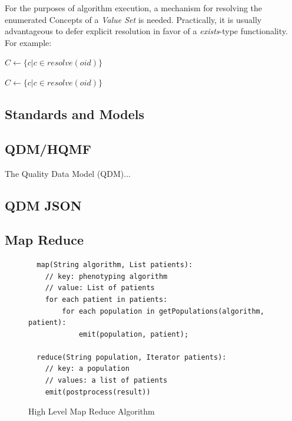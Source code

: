 \documentclass{amia}
\begin{document}
For the purposes of algorithm execution, a mechanism for resolving the enumerated Concepts of a \textit{Value Set} is needed. Practically, it is usually advantageous to defer explicit resolution in favor of a \textit{exists}-type functionality. For example:

\begin{algorithm}
\begin{algorithmic}[1]
  \State $C \gets \{c | c \in resolve(oid)\}$
  \State {}
\EndProcedure
\end{algorithmic}
\end{algorithm}

\begin{algorithm}
\begin{algorithmic}[1]
  \State $C \gets \{c | c \in resolve(oid)\}$
  \State {}
\EndProcedure
\end{algorithmic}
\end{algorithm}


\subsection*{Standards and Models}
\subsection*{QDM/HQMF}
The Quality Data Model (QDM)\cite{behilngquality}...
\subsection*{QDM JSON}

\subsection*{Map Reduce}

\begin{figure}[H]
\begin{verbatim}
  map(String algorithm, List patients):
    // key: phenotyping algorithm
    // value: List of patients
    for each patient in patients:
        for each population in getPopulations(algorithm, patient):
            emit(population, patient);

  reduce(String population, Iterator patients):
    // key: a population
    // values: a list of patients
    emit(postprocess(result))
\end{verbatim}
\caption{High Level Map Reduce Algorithm} 
\label{fig:map_reduce}
\end{figure}
\end{document}
